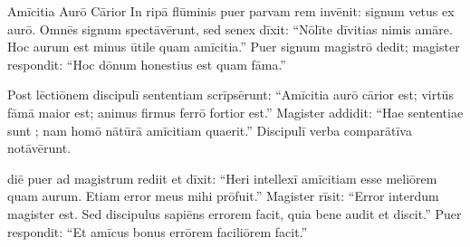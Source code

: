 \documentclass[12pt]{nextbook}
\begin{document}
\begin{readersection}{Amīcitia Aurō Cārior}
In ripā flūminis puer parvam rem invēnit: signum vetus ex aurō. Omnēs signum spectāvērunt, sed senex dīxit: “Nōlīte dīvitias nimis amāre. Hoc aurum est minus ūtile quam amīcitia.” Puer signum magistrō dedit; magister respondit: “Hoc dōnum honestius est quam fāma.”

Post lēctiōnem discipulī sententiam scrīpsērunt: “Amīcitia aurō cārior est; virtūs fāmā maior est; animus firmus ferrō fortior est.” Magister addidit: “Hae sententiae sunt ; nam homō nātūrā amīcitiam quaerit.” Discipulī verba comparātīva notāvērunt.

 diē puer ad magistrum rediit et dīxit: “Heri intellexī amīcitiam esse meliōrem quam aurum. Etiam error meus mihi prōfuit.” Magister rīsit: “Error interdum magister est. Sed discipulus sapiēns errorem  facit, quia bene audit et discit.” Puer respondit: “Et amīcus bonus errōrem faciliōrem facit.”

\end{readersection}
\end{document}
